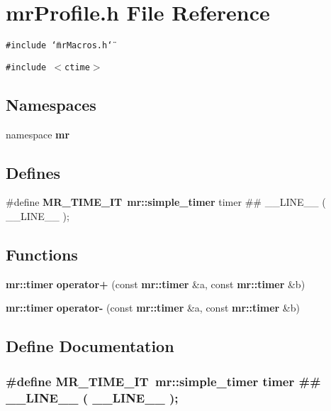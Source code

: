 \section{mr\-Profile.h File Reference}
\label{mrProfile_8h}
{\tt \#include \char`\"{}mr\-Macros.h\char`\"{}}\par
{\tt \#include $<$ctime$>$}\par
\subsection*{Namespaces}
\begin{CompactItemize}
\item 
namespace {\bf mr}
\end{CompactItemize}
\subsection*{Defines}
\begin{CompactItemize}
\item 
\#define {\bf MR\_\-TIME\_\-IT}\ {\bf mr::simple\_\-timer}  timer \#\# \_\-\_\-LINE\_\-\_\- ( \_\-\_\-LINE\_\-\_\- );
\end{CompactItemize}
\subsection*{Functions}
\begin{CompactItemize}
\item 
{\bf mr::timer} {\bf operator+} (const {\bf mr::timer} \&a, const {\bf mr::timer} \&b)
\item 
{\bf mr::timer} {\bf operator-} (const {\bf mr::timer} \&a, const {\bf mr::timer} \&b)
\end{CompactItemize}


\subsection{Define Documentation}
\subsubsection{\setlength{\rightskip}{0pt plus 5cm}\#define MR\_\-TIME\_\-IT\ {\bf mr::simple\_\-timer}  timer \#\# \_\-\_\-LINE\_\-\_\- ( \_\-\_\-LINE\_\-\_\- );}\label{mrProfile_8h_a0}




